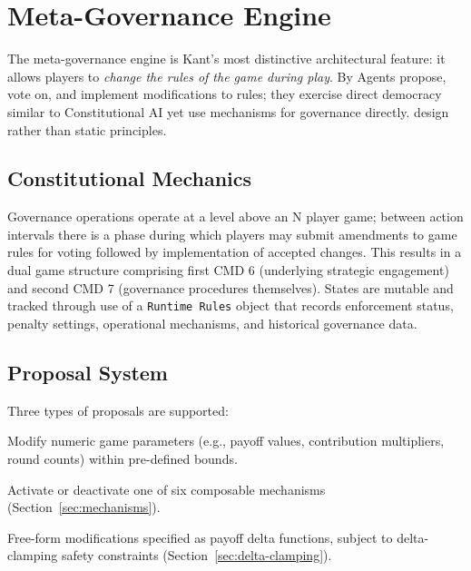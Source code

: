 
\section{Meta-Governance Engine}
\label{sec:governance}

The meta-governance engine is Kant's most distinctive architectural feature:
it allows players to \emph{change the rules of the game during play}. By
Agents propose, vote on, and implement modifications to rules; they exercise direct democracy similar to Constitutional AI yet use mechanisms for governance directly.
design rather than static principles.

\subsection{Constitutional Mechanics}
\label{sec:constitutional}

Governance operations operate at a level above an N player game; between action intervals there is a phase during which players may submit amendments to game rules for voting followed by implementation of accepted changes. This results in a dual game structure comprising first CMD 6 (underlying strategic engagement) and second CMD 7 (governance procedures themselves). States are mutable and tracked through use of a \texttt{Runtime Rules} object that records enforcement status, penalty settings, operational mechanisms, and historical governance data.

\subsection{Proposal System}
\label{sec:proposals}

Three types of proposals are supported:

\begin{description}[nosep]
    \item[Parameter Proposals.] Modify numeric game parameters (e.g., payoff
        values, contribution multipliers, round counts) within pre-defined
        bounds.
    \item[Mechanic Proposals.] Activate or deactivate one of six composable
        mechanisms (Section~\ref{sec:mechanisms}).
    \item[Custom Proposals.] Free-form modifications specified as payoff
        delta functions, subject to delta-clamping safety constraints
        (Section~\ref{sec:delta-clamping}).
\end{description}

